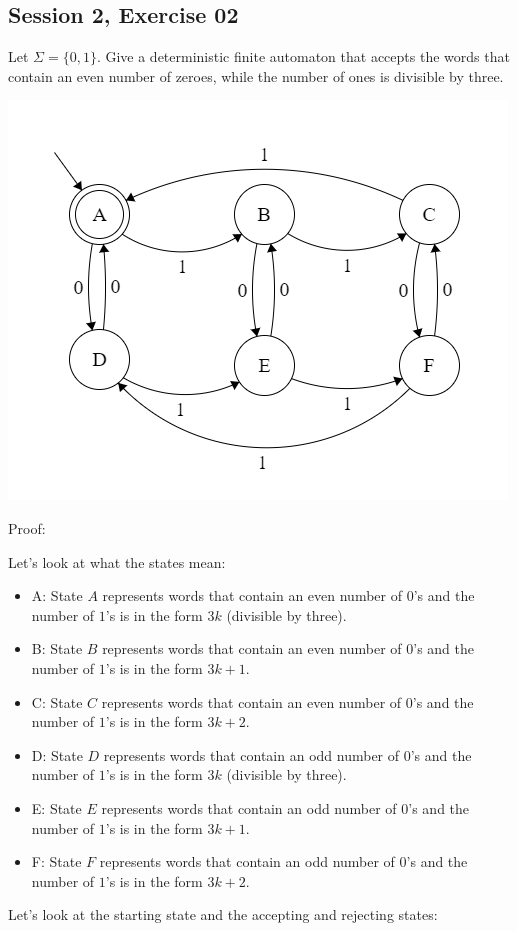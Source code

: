 \subsection{Session 2, Exercise 02}


Let $\Sigma=\{0,1\}$. Give a deterministic finite automaton that accepts the words that contain an even number of zeroes, while the number of ones is divisible by three.



\includegraphics[width=0.5\linewidth]{02/2_2.png}

Proof:

Let's look at what the states mean:

\begin{itemize}
    \item A: State $A$ represents words that contain an even number of $0$'s and the number of $1$'s is in the form $3k$ (divisible by three).
    \item B: State $B$ represents words that contain an even number of $0$'s and the number of $1$'s is in the form $3k+1$.
    \item C: State $C$ represents words that contain an even number of $0$'s and the number of $1$'s is in the form $3k+2$.
    \item D: State $D$ represents words that contain an odd number of $0$'s and the number of $1$'s is in the form $3k$ (divisible by three).
    \item E: State $E$ represents words that contain an odd number of $0$'s and the number of $1$'s is in the form $3k+1$.
    \item F: State $F$ represents words that contain an odd number of $0$'s and the number of $1$'s is in the form $3k+2$.
\end{itemize}

Let's look at the starting state and the accepting and rejecting states:

